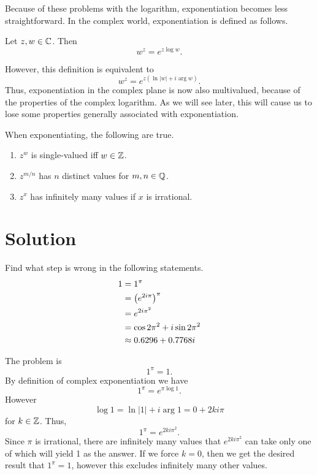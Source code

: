 \documentclass[notitlepage]{problem-solving}
\begin{document}
Because of these problems with the logarithm, exponentiation becomes less straightforward.
In the complex world, exponentiation is defined as follows.
\begin{definition}
	Let $z,w\in\mathbb{C}$.
	Then
	\[
		w^z = e^{z\log w}.
	\]
\end{definition}
However, this definition is equivalent to
\[
	w^z = e^{z(\ln|w| + i\arg w)}.
\]
Thus, exponentiation in the complex plane is now also multivalued, because of the properties of the complex logarithm.
As we will see later, this will cause us to lose some properties generally associated with exponentiation.

When exponentiating, the following are true.
\begin{enumerate}
	\item $z^w$ is single-valued iff $w\in\mathbb{Z}$.
	\item $z^{m/n}$ has $n$ distinct values for $m,n\in\mathbb{Q}$.
	\item $z^x$ has infinitely many values if $x$ is irrational.
\end{enumerate}

\section{Solution}

\begin{problem*}
	Find what step is wrong in the following statements.
	\begin{align*}
		1 &= 1^\pi\\
		&= \left( e^{2i\pi} \right)^\pi\\
		&=e^{2i\pi^2}\\
		&=\cos 2\pi^2 + i\sin 2\pi^2\\
		&\approx 0.6296 +0.7768 i
	\end{align*}
\end{problem*}

The problem is
\[
	1^\pi = 1.
\]
By definition of complex exponentiation we have
\[
	1^\pi = e^{\pi\log 1}.
\]
However
\[
	\log 1 = \ln |1| + i\arg 1 = 0 + 2ki\pi
\]
for $k\in\mathbb{Z}$.
Thus,
\[
	1^{\pi} = e^{2ki\pi^2}.
\]
Since $\pi$ is irrational, there are infinitely many values that $e^{2ki\pi^2}$ can take only one of which will yield 1 as the answer.
If we force $k=0$, then we get the desired result that $1^\pi = 1$, however this excludes infinitely many other values.
\end{document}
